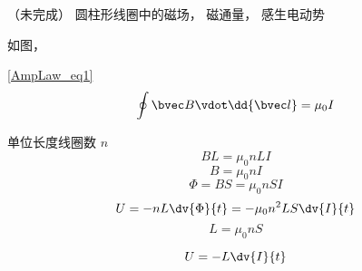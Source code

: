 

（未完成） 圆柱形线圈中的磁场， 磁通量， 感生电动势

如图， 

\autoref{AmpLaw_eq1}
\begin{equation}
\oint \bvec B \vdot \dd{\bvec l} = \mu_0 I
\end{equation}

单位长度线圈数 $n$
\begin{equation}
BL = \mu_0nLI
\end{equation}
\begin{equation}
B = \mu_0nI
\end{equation}
\begin{equation}
\Phi = BS = \mu_0nSI
\end{equation}
\begin{equation}
U = -nL\dv{\Phi}{t} = -\mu_0n^2LS \dv{I}{t}
\end{equation}
\begin{equation}
L = \mu_0nS
\end{equation}

\begin{equation}
U = -L\dv{I}{t}
\end{equation}
